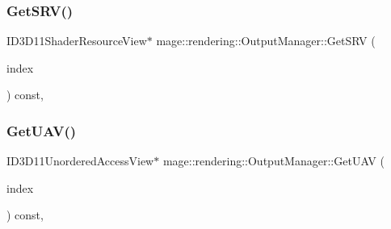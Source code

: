\hypertarget{classmage_1_1rendering_1_1_output_manager_a0dc5e124cbd78351b78cc7a3e7bff428}{}\label{classmage_1_1rendering_1_1_output_manager_a0dc5e124cbd78351b78cc7a3e7bff428} 
\subsubsection{\texorpdfstring{Get\+S\+R\+V()}{GetSRV()}}
{\footnotesize\ttfamily I\+D3\+D11\+Shader\+Resource\+View$\ast$ mage\+::rendering\+::\+Output\+Manager\+::\+Get\+S\+RV (\begin{DoxyParamCaption}\item[{\hyperlink{classmage_1_1rendering_1_1_output_manager_a941f1b35a83ee0ce190494523ec0fe63}{S\+R\+V\+Index}}]{index }\end{DoxyParamCaption}) const\hspace{0.3cm}{\ttfamily [private]}, {\ttfamily [noexcept]}}

\hypertarget{classmage_1_1rendering_1_1_output_manager_a6eb1f3b756f121897fd869c355944e86}{}\label{classmage_1_1rendering_1_1_output_manager_a6eb1f3b756f121897fd869c355944e86} 
\subsubsection{\texorpdfstring{Get\+U\+A\+V()}{GetUAV()}}
{\footnotesize\ttfamily I\+D3\+D11\+Unordered\+Access\+View$\ast$ mage\+::rendering\+::\+Output\+Manager\+::\+Get\+U\+AV (\begin{DoxyParamCaption}\item[{\hyperlink{classmage_1_1rendering_1_1_output_manager_a71b3797fef957312f92736f15b7ada3e}{U\+A\+V\+Index}}]{index }\end{DoxyParamCaption}) const\hspace{0.3cm}{\ttfamily [private]}, {\ttfamily [noexcept]}}

\hypertarget{classmage_1_1rendering_1_1_output_manager_a7fb15ee3d3e3f7be648071ef1c6f3c6d}{}\label{classmage_1_1rendering_1_1_output_manager_a7fb15ee3d3e3f7be648071ef1c6f3c6d} 
